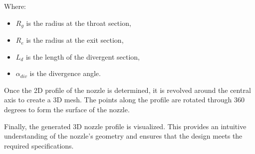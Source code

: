 \begin{itemize}
Where:
\begin{itemize}
    \item $R_g$ is the radius at the throat section,
    \item \(R_e\) is the radius at the exit section,
    \item \(L_d\) is the length of the divergent section,
    \item \(\alpha_{div}\) is the divergence angle.
\end{itemize}

Once the 2D profile of the nozzle is determined, it is revolved around the central axis to create a 3D mesh. 
The points along the profile are rotated through 360 degrees to form the surface of the nozzle.

Finally, the generated 3D nozzle profile is visualized.
This provides an intuitive understanding of the nozzle's geometry and ensures that the design meets the required specifications.

\end{itemize}

